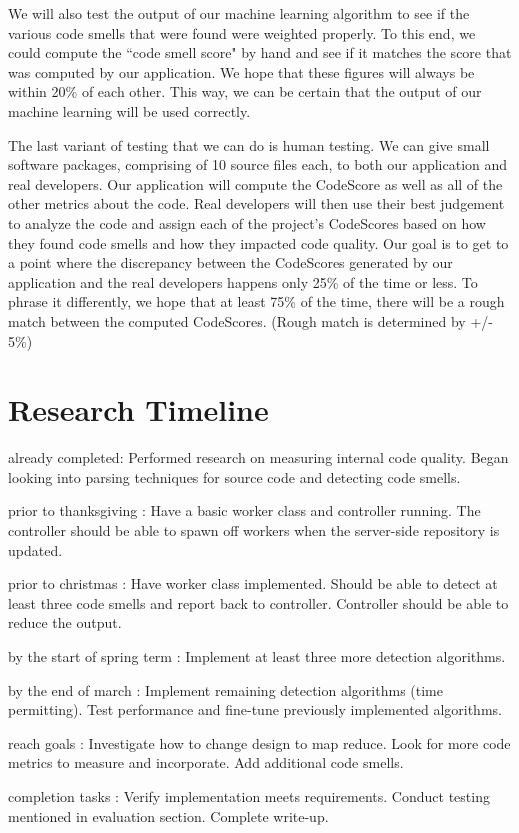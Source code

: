 \documentclass{sig-alternate}
\begin{document}
We will also test the output of our machine learning algorithm to see if the various code smells that were found were weighted properly. To this end, we could compute the ``code smell score" by hand and see if it matches the score that was computed by our application. We hope that these figures will always be within 20\% of each other. This way, we can be certain that the output of our machine learning will be used correctly.

The last variant of testing that we can do is human testing. We can give small software packages, comprising of 10 source files each, to both our application and real developers. Our application will compute the CodeScore as well as all of the other metrics about the code. Real developers will then use their best judgement to analyze the code and assign each of the project's CodeScores based on how they found code smells and how they impacted code quality. Our goal is to get to a point where the discrepancy between the CodeScores generated by our application and the real developers happens only 25\% of the time or less. To phrase it differently, we hope that at least 75\% of the time, there will be a rough match between the computed CodeScores. (Rough match is determined by +/- 5\%)
\section{Research Timeline}
\label{sec:research_timeline}
\begin{itemize*}
	\item {\sc already completed}: Performed research on measuring internal code quality. Began looking into parsing techniques for source code and detecting code smells.\vspace{3pt}
	\item {\sc prior to thanksgiving} : Have a basic worker class and controller running. The controller should be able to spawn off workers when the server-side repository is updated.\vspace{3pt}
	\item {\sc prior to christmas} : Have worker class implemented. Should be able to detect at least three code smells and report back to controller. Controller should be able to reduce the output.\vspace{3pt}
\item {\sc by the start of spring term} : Implement at least three more detection algorithms.\vspace{3pt}	
\item {\sc by the end of march} : Implement remaining detection algorithms (time permitting). Test performance and fine-tune previously implemented algorithms. \vspace{3pt}
\item {\sc reach goals} : Investigate how to change design to map reduce. Look for more code metrics to measure and incorporate. Add additional code smells. \vspace{3pt}
\item {\sc completion tasks} : Verify implementation meets requirements. Conduct testing mentioned in evaluation section. Complete write-up.\vspace{3pt}
\end{itemize*}
\end{document}
